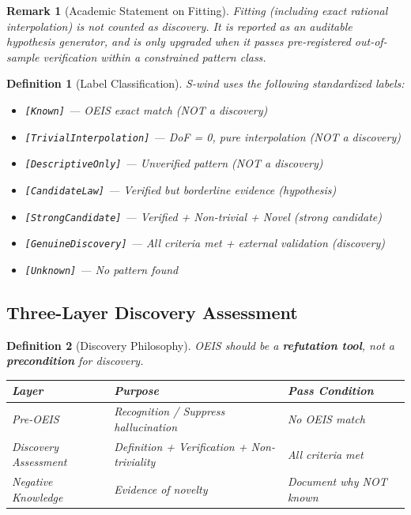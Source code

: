 \documentclass[11pt,a4paper]{article}
\newtheorem{definition}{Definition}
\newtheorem{remark}{Remark}
\begin{document}
\begin{remark}[Academic Statement on Fitting]
\textit{Fitting (including exact rational interpolation) is not counted as discovery. It is reported as an auditable hypothesis generator, and is only upgraded when it passes pre-registered out-of-sample verification within a constrained pattern class.}
\end{remark}

\begin{definition}[Label Classification]
S-wind uses the following standardized labels:
\begin{itemize}
    \item \texttt{[Known]} --- OEIS exact match (NOT a discovery)
    \item \texttt{[TrivialInterpolation]} --- DoF = 0, pure interpolation (NOT a discovery)
    \item \texttt{[DescriptiveOnly]} --- Unverified pattern (NOT a discovery)
    \item \texttt{[CandidateLaw]} --- Verified but borderline evidence (hypothesis)
    \item \texttt{[StrongCandidate]} --- Verified + Non-trivial + Novel (strong candidate)
    \item \texttt{[GenuineDiscovery]} --- All criteria met + external validation (discovery)
    \item \texttt{[Unknown]} --- No pattern found
\end{itemize}
\end{definition}

\subsection{Three-Layer Discovery Assessment}

\begin{definition}[Discovery Philosophy]
OEIS should be a \textbf{refutation tool}, not a \textbf{precondition} for discovery.

\begin{center}
\begin{tabular}{|l|l|l|}
\hline
\textbf{Layer} & \textbf{Purpose} & \textbf{Pass Condition} \\
\hline
Pre-OEIS & Recognition / Suppress hallucination & No OEIS match \\
Discovery Assessment & Definition + Verification + Non-triviality & All criteria met \\
Negative Knowledge & Evidence of novelty & Document why NOT known \\
\hline
\end{tabular}
\end{center}
\end{definition}
\end{document}
